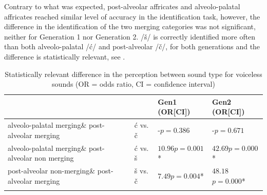 \documentclass[output=paper,
modfonts,
newtxmath,
hidelinks,
]{langscibook}
\begin{document}
Contrary to what was expected, post-alveolar affricates and alveolo-palatal affricates reached similar level of accuracy in the identification task, however, the difference in the identification of the two merging categories was not significant, neither for Generation 1 nor Generation 2. /š/ is correctly identified more often than both alveolo-palatal /ć/ and post-alveolar /č/, for both generations and the difference is statistically relevant, see .

\begin{table}
\begin{tabularx}{\textwidth}{p{4.5cm}lXX}
\lsptoprule
&  &  \textbf{Gen1} (OR[CI]) &  \textbf{Gen2} (OR[CI])\\
\midrule
alveolo-palatal merging\newline\& post-alveolar merging & ć vs. č & {}-\newline $p=0.386$ & {}-\newline $p=0.671$\vspace{20pt}\\
alveolo-palatal merging\newline\& post-alveolar non merging & ć vs. š & $10.96$\newline[$2.85$--$42.06$]\newline $p=0.001$*& $42.69$\newline[$9.89$--$184.38$]\newline $p=0.000$*\vspace{6pt}\\
post-alveolar non-merging\newline\& post-alveolar merging & š vs. č & $7.49$\newline[$1.07$--$29.05$]\newline $p=0.004$* & $48.18$ \newline [$11.17$--$207.89$]\newline $p=0.000$*\\
\lspbottomrule
\end{tabularx}
\caption{\label{tab:mihajlovic:7} Statistically relevant difference in the perception between sound type for voiceless sounds (OR = odds ratio, CI = confidence interval)}
\end{table}
\end{document}
